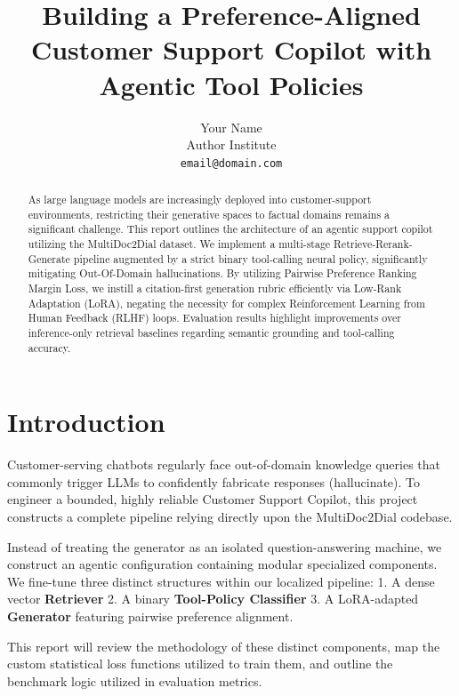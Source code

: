 \documentclass[11pt]{article}
\title{Building a Preference-Aligned Customer Support Copilot with Agentic Tool Policies}
\author{Your Name \\
  Author Institute \\
  \texttt{email@domain.com} \\}
\begin{document}
\maketitle
\begin{abstract}
As large language models are increasingly deployed into customer-support environments, restricting their generative spaces to factual domains remains a significant challenge. This report outlines the architecture of an agentic support copilot utilizing the MultiDoc2Dial dataset. We implement a multi-stage Retrieve-Rerank-Generate pipeline augmented by a strict binary tool-calling neural policy, significantly mitigating Out-Of-Domain hallucinations. By utilizing Pairwise Preference Ranking Margin Loss, we instill a citation-first generation rubric efficiently via Low-Rank Adaptation (LoRA), negating the necessity for complex Reinforcement Learning from Human Feedback (RLHF) loops. Evaluation results highlight improvements over inference-only retrieval baselines regarding semantic grounding and tool-calling accuracy.
\end{abstract}

\section{Introduction}
Customer-serving chatbots regularly face out-of-domain knowledge queries that commonly trigger LLMs to confidently fabricate responses (hallucinate). To engineer a bounded, highly reliable Customer Support Copilot, this project constructs a complete pipeline relying directly upon the MultiDoc2Dial codebase. 

Instead of treating the generator as an isolated question-answering machine, we construct an agentic configuration containing modular specialized components. We fine-tune three distinct structures within our localized pipeline:
1. A dense vector \textbf{Retriever}
2. A binary \textbf{Tool-Policy Classifier} 
3. A LoRA-adapted \textbf{Generator} featuring pairwise preference alignment.

This report will review the methodology of these distinct components, map the custom statistical loss functions utilized to train them, and outline the benchmark logic utilized in evaluation metrics.
\end{document}

